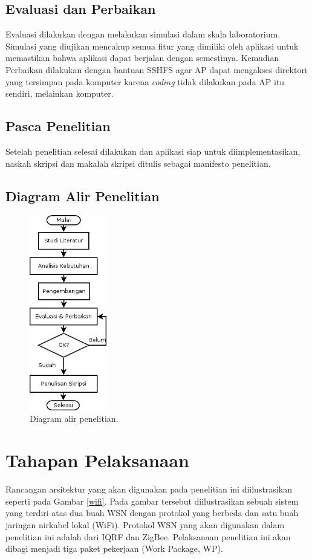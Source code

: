 	\subsection{Evaluasi dan Perbaikan}
		Evaluasi dilakukan dengan melakukan simulasi dalam skala laboratorium. Simulasi yang diujikan mencakup semua fitur yang dimiliki oleh aplikasi untuk memastikan bahwa aplikasi dapat berjalan dengan semestinya. Kemudian Perbaikan dilakukan dengan bantuan SSHFS agar AP dapat mengakses direktori yang tersimpan pada komputer karena \emph{coding} tidak dilakukan pada AP itu sendiri, melainkan komputer.

	\subsection{Pasca Penelitian}
		Setelah penelitian selesai dilakukan dan aplikasi siap untuk diimplementasikan, naskah skripsi dan makalah skripsi ditulis sebagai manifesto penelitian.

	\subsection{Diagram Alir Penelitian}
		\begin{figure}[ht!]
		  \centering
		    \includegraphics[width=0.3\textwidth]{gambar/flowchart}
		    \caption{Diagram alir penelitian.}
		    \label{flowchart-penelitian}
		\end{figure}


\section{Tahapan Pelaksanaan}
	Rancangan arsitektur yang akan digunakan pada penelitian ini diilustrasikan seperti pada Gambar \ref{wifi}. Pada gambar tersebut diilustrasikan sebuah sistem yang terdiri atas dua buah WSN dengan protokol yang berbeda dan satu buah jaringan nirkabel lokal (WiFi). Protokol WSN yang akan digunakan dalam penelitian ini adalah dari IQRF dan ZigBee. Pelaksanaan penelitian ini akan dibagi menjadi tiga paket pekerjaan (Work Package, WP).

